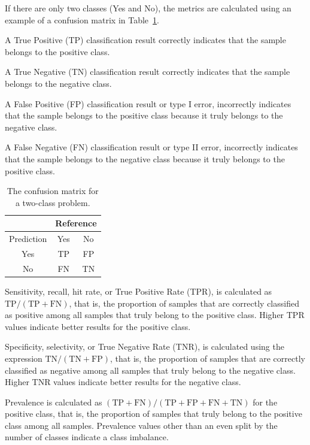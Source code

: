 \documentclass[sn-mathphys-num]{sn-jnl}%
\begin{document}
If there are only two classes (Yes and No), the metrics are calculated using an example of a confusion matrix in Table~\ref{tab:cm}.

A True Positive (TP) classification result correctly indicates that the sample belongs to the positive class.

A True Negative (TN) classification result correctly indicates that the sample belongs to the negative class.
 
A False Positive (FP) classification result or type I error, incorrectly indicates that the sample belongs to the positive class because it truly belongs to the negative class.

A False Negative (FN) classification result or type II error, incorrectly indicates that the sample belongs to the negative class because it truly belongs to the positive class.

\begin{table}[!ht]
    \centering
    \caption{The confusion matrix for a two-class problem.}
	\label{tab:cm}
	\begin{tabular}{|c|c|c|}
		\hline
		 & \multicolumn{2}{|c|}{Reference} \\ \hline
        Prediction & Yes & No \\ \hline
        Yes &TP & FP \\ \hline
        No & FN & TN \\ \hline
	\end{tabular}
\end{table}

Sensitivity, recall, hit rate, or True Positive Rate (TPR), is calculated as $\mathrm{TP}/(\mathrm{TP}+\mathrm{FN})$, that is, the proportion of samples that are correctly classified as positive among all samples that truly belong to the positive class. Higher TPR values indicate better results for the positive class.

Specificity, selectivity, or True Negative Rate (TNR), is calculated using the expression $\mathrm{TN}/(\mathrm{TN}+\mathrm{FP})$, that is, the proportion of samples that are correctly classified as negative among all samples that truly belong to the negative class. Higher TNR values indicate better results for the negative class.

Prevalence is calculated as $(\mathrm{TP}+\mathrm{FN})/(\mathrm{TP}+\mathrm{FP}+\mathrm{FN}+\mathrm{TN})$ for the positive class, that is, the proportion of samples that truly belong to the positive class among all samples. Prevalence values other than an even split by the number of classes indicate a class imbalance.
\end{document}

